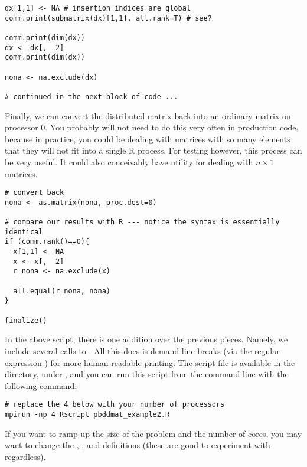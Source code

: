 \begin{lstlisting}[language=rr,title=Insertion and Extraction]
dx[1,1] <- NA # insertion indices are global
comm.print(submatrix(dx)[1,1], all.rank=T) # see?

comm.print(dim(dx))
dx <- dx[, -2]
comm.print(dim(dx))

nona <- na.exclude(dx)

# continued in the next block of code ...
\end{lstlisting}

Finally, we can convert the distributed matrix back into an ordinary  matrix on processor 0.  You probably will not need to do this very often in production code, because in practice, you could be dealing with matrices with so many elements that they will not fit into a single R process.  For testing however, this process can be very useful.  It could also conceivably have utility for dealing with $n\times 1$ matrices.

\begin{lstlisting}[language=rr,title=Insertion and Extraction]
# convert back
nona <- as.matrix(nona, proc.dest=0)

# compare our results with R --- notice the syntax is essentially identical
if (comm.rank()==0){
  x[1,1] <- NA
  x <- x[, -2]
  r_nona <- na.exclude(x)
  
  all.equal(r_nona, nona)
}

finalize()
\end{lstlisting}


In the above script, there is one addition over the previous pieces.  Namely, we include several calls to .  All this does is demand line breaks (via the regular expression ) for more human-readable printing.
\np
The script file is available in the  directory, under , and you can run this script from the command line with the following command:

\begin{lstlisting}
# replace the 4 below with your number of processors
mpirun -np 4 Rscript pbddmat_example2.R
\end{lstlisting}

If you want to ramp up the size of the problem and the number of cores, you may want to change the , , and  definitions (these are good to experiment with regardless). 